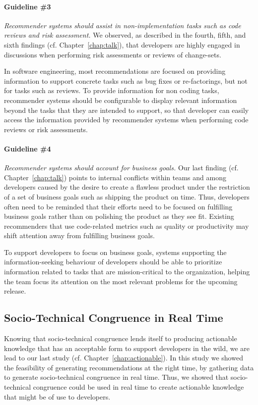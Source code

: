 \paragraph{Guideline \#3} \emph{Recommender systems should assist in non-implementation tasks such as code reviews and risk assessment.} 
We observed, as described in the fourth, fifth, and sixth findings  (cf. Chapter~\ref{chap:talk}), that developers are highly engaged in discussions when performing risk assessments or reviews of change-sets. 

In software engineering, most recommendations are focused on providing information to support concrete tasks such as bug fixes or re-factorings, but not for tasks such as reviews. To provide information for non coding tasks, recommender systems should be configurable to display relevant information beyond the tasks that they are intended to support, so that developer can easily access the information provided by recommender systems when performing code reviews or risk assessments.

\paragraph{Guideline \#4} \emph{Recommender systems should account for business goals.}
Our last finding (cf. Chapter~\ref{chap:talk}) points to internal conflicts within teams and among developers caused by the desire to create a flawless product under the restriction of a set of business goals such as shipping the product on time.
Thus, developers often need to be reminded that their efforts need to be focused on fulfilling business goals rather than on polishing the product as they see fit. Existing recommenders that use code-related metrics such as quality or productivity may shift attention away from fulfilling business goals.

To support developers to focus on business goals, systems supporting the information-seeking behaviour of developers should be able to prioritize information related to tasks that are mission-critical to the organization, helping the team focus its attention on the most relevant problems for the upcoming release.


\subsection{Socio-Technical Congruence in Real Time}
Knowing that socio-technical congruence lends itself to producing actionable knowledge that has an acceptable form to support developers in the wild, we are lead to our last study (cf. Chapter~\ref{chap:actionable}).
In this study we showed the feasibility of generating recommendations at the right time, by gathering data to generate socio-technical congruence in real time.
Thus, we showed that socio-technical congruence could be used in real time to create actionable knowledge that might be of use to developers.


